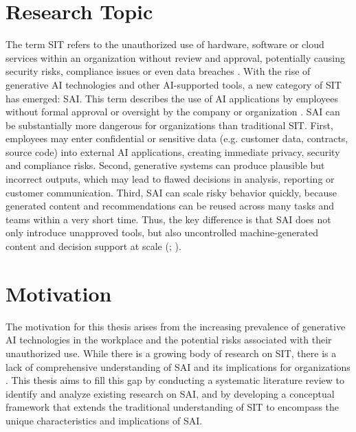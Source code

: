 \documentclass[12pt,oneside]{article}
\begin{document}
\clearpage
{}  
    \setcounter{page}{1}
\lhead{\nouppercase{\leftmark}}


\section{Research Topic} \label{researchtopic}

The term \ac{SIT} refers to the unauthorized use of hardware, software or cloud services within an organization without review and approval, potentially causing security risks, compliance issues or even data breaches \citep[145]{RN432}. With the rise of generative \ac{AI} technologies and other AI-supported tools, a new category of \ac{SIT} has emerged: \ac{SAI}. This term describes the use of \ac{AI} applications by employees without formal approval or oversight by the company or organization \citep[1-2]{RN287}. \ac{SAI} can be substantially more dangerous for organizations than traditional \ac{SIT}. First, employees may enter confidential or sensitive data (e.g. customer data, contracts, source code) into external \ac{AI} applications, creating immediate privacy, security and compliance risks. Second, generative systems can produce plausible but incorrect outputs, which may lead to flawed decisions in analysis, reporting or customer communication. Third, \ac{SAI} can scale risky behavior quickly, because generated content and recommendations can be reused across many tasks and teams within a very short time. Thus, the key difference is that \ac{SAI} does not only introduce unapproved tools, but also uncontrolled machine-generated content and decision support at scale (\citealp[1137]{RN1621}; \citealp[5]{RN287}).

\section{Motivation} \label{motivation}

The motivation for this thesis arises from the increasing prevalence of generative \ac{AI} technologies in the workplace and the potential risks associated with their unauthorized use. While there is a growing body of research on \ac{SIT}, there is a lack of comprehensive understanding of \ac{SAI} and its implications for organizations \citep[5]{RN287}. This thesis aims to fill this gap by conducting a systematic literature review to identify and analyze existing research on \ac{SAI}, and by developing a conceptual framework that extends the traditional understanding of \ac{SIT} to encompass the unique characteristics and implications of \ac{SAI}.
\end{document}
